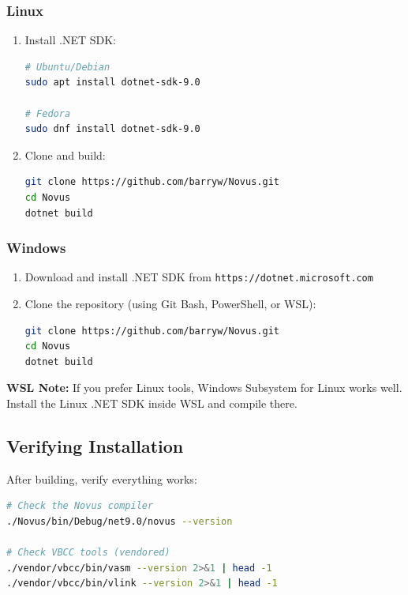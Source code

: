 \subsubsection{Linux}

\begin{enumerate}
\item Install .NET SDK:
\begin{lstlisting}[language=bash]
# Ubuntu/Debian
sudo apt install dotnet-sdk-9.0

# Fedora
sudo dnf install dotnet-sdk-9.0
\end{lstlisting}

\item Clone and build:
\begin{lstlisting}[language=bash]
git clone https://github.com/barryw/Novus.git
cd Novus
dotnet build
\end{lstlisting}
\end{enumerate}

\subsubsection{Windows}

\begin{enumerate}
\item Download and install .NET SDK from \texttt{https://dotnet.microsoft.com}

\item Clone the repository (using Git Bash, PowerShell, or WSL):
\begin{lstlisting}[language=bash]
git clone https://github.com/barryw/Novus.git
cd Novus
dotnet build
\end{lstlisting}
\end{enumerate}

\textbf{WSL Note:} If you prefer Linux tools, Windows Subsystem for Linux works well. Install the Linux .NET SDK inside WSL and compile there.

\subsection{Verifying Installation}

After building, verify everything works:

\begin{lstlisting}[language=bash]
# Check the Novus compiler
./Novus/bin/Debug/net9.0/novus --version

# Check VBCC tools (vendored)
./vendor/vbcc/bin/vasm --version 2>&1 | head -1
./vendor/vbcc/bin/vlink --version 2>&1 | head -1
\end{lstlisting}

